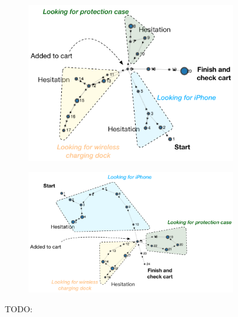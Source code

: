 \begin{figure}[H]
    \centering
    \begin{subfigure}[b]{0.60\textwidth}
        \includegraphics[width=1\textwidth]{figures/vis-goal1}
        \caption{}
        \label{fig:vis-goal1}
    \end{subfigure}
    \begin{subfigure}[b]{0.60\textwidth}
        \includegraphics[width=1\textwidth]{figures/vis-goal2}
        \caption{}
        \label{fig:vis-goal2}
    \end{subfigure}
    \caption{TODO:}
    \label{fig:vis-goal}
\end{figure}


